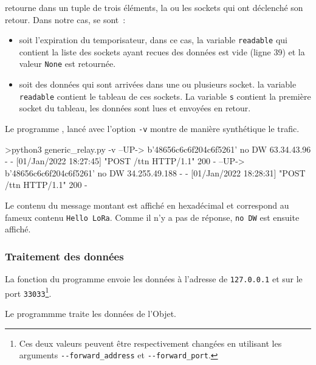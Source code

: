  retourne dans un tuple de trois éléments, la ou les sockets qui ont déclenché son retour. Dans notre cas, se sont~:
\begin{itemize}
    \item soit l'expiration du temporisateur, dans ce cas, la variable \texttt{readable} qui contient la liste des sockets ayant recues des données est vide (ligne 39) et la valeur \texttt{None} est retournée.
    \item soit des données qui sont arrivées dans une ou plusieurs socket. la variable \texttt{readable} contient le tableau de ces sockets. La variable \texttt{s} contient la première socket du tableau, les données sont lues et envoyées en retour.
\end{itemize}

         \vspace{1em}

Le programme , lancé avec l'option \texttt{-v} montre de manière synthétique le trafic. 

\begin{termc}[backgroundcolor=\color{palerod}, basicstyle=\ttfamily\small, escapechar=@]
>python3 generic_relay.py -v
--UP-> b'48656c6c6f204c6f5261'
no DW
63.34.43.96 - - [01/Jan/2022 18:27:45] "POST /ttn HTTP/1.1" 200 -
--UP-> b'48656c6c6f204c6f5261'
no DW
34.255.49.188 - - [01/Jan/2022 18:28:31] "POST /ttn HTTP/1.1" 200 -
\end{termc}

Le contenu du message montant est affiché en hexadécimal et correspond au fameux contenu \texttt{Hello LoRa}. Comme il n'y a pas de réponse, \texttt{no DW} est ensuite affiché.

\subsubsection{Traitement des données}

La fonction \texttt{} du programme  envoie les données à l'adresse de \textit{} \texttt{127.0.0.1} et sur le port \texttt{33033}\footnote{Ces deux valeurs peuvent être respectivement changées  en utilisant les arguments \texttt{-{}-forward\_address} et  \texttt{-{}-forward\_port}.}.

Le programmme  traite les données de l'Objet.


